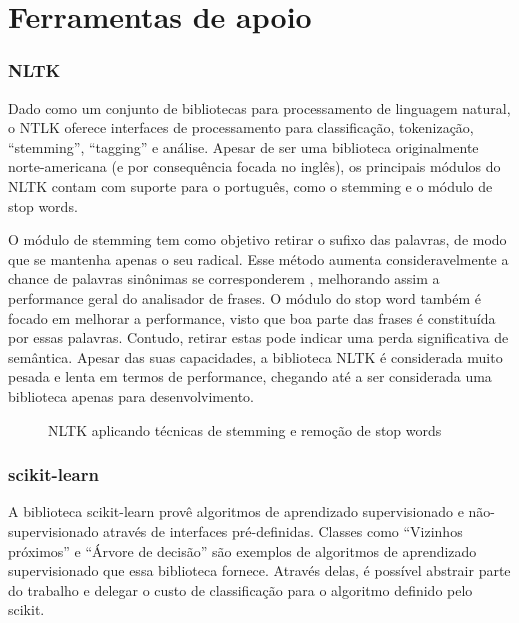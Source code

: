 \chapter[Ferramentas de apoio]{Ferramentas de apoio}

\subsection{NLTK}

Dado como um conjunto de bibliotecas para processamento de linguagem natural, o NTLK oferece interfaces de processamento para classificação, tokenização, “stemming”, “tagging” e análise. Apesar de ser uma biblioteca originalmente norte-americana (e por consequência focada no inglês), os principais módulos do NLTK contam com suporte para o português, como o stemming e o módulo de stop words.

O módulo de stemming tem como objetivo retirar o sufixo das palavras, de modo que se mantenha apenas o seu radical. Esse método aumenta consideravelmente a chance de palavras sinônimas se corresponderem \cite{marconltk}, melhorando assim a performance geral do analisador de frases. O módulo do stop word também é focado em melhorar a performance, visto que boa parte das frases é constituída por essas palavras. Contudo, retirar estas pode indicar uma perda significativa de semântica. Apesar das suas capacidades, a biblioteca NLTK é considerada muito pesada e lenta em termos de performance, chegando até a ser considerada uma biblioteca apenas para desenvolvimento.

\begin{figure}[!htb]
    \caption{\label{fig:my-label} NLTK aplicando técnicas de stemming e remoção de stop words}
\end{figure}

\subsection{scikit-learn}

A biblioteca scikit-learn provê algoritmos de aprendizado supervisionado e não-supervisionado através de interfaces pré-definidas. Classes como “Vizinhos próximos” e “Árvore de decisão” são exemplos de algoritmos de aprendizado supervisionado que essa biblioteca fornece. Através delas, é possível abstrair parte do trabalho e delegar o custo de classificação para o algoritmo definido pelo scikit.

